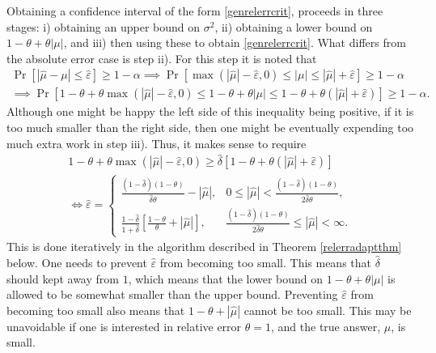 \documentclass[graybox]{svmult}
\newcommand{\Prob}{\Pr}
\newcommand{\abs}[1]{\left|#1\right|}
\newcommand{\hmu}{\hat{\mu}}
\newcommand{\hdelta}{\hat{\delta}}
\newcommand{\hvareps}{\hat{\varepsilon}}
\def\abs#1{\ensuremath{\left \lvert #1 \right \rvert}}
\begin{document}
Obtaining a confidence interval of the form \eqref{genrelerrcrit}, proceeds in three stages: i) obtaining an upper bound on $\sigma^2$, ii) obtaining a lower bound on $1-\theta + \theta\abs{\mu}$, and iii) then using these to obtain \eqref{genrelerrcrit}.  What differs from the absolute error case is step ii).  For this step it is noted that
\begin{multline} \label{relerrcritd}
\Prob\left[\abs{\hmu-\mu} \le \hvareps \right] \ge 1-\alpha \implies \Prob[\max(\abs{\hmu}-\hvareps,0) \le \abs{\mu} \le \abs{\hmu}+\hvareps] \ge 1-\alpha \\
\implies \Prob[1-\theta + \theta\max(\abs{\hmu}-\hvareps,0) \le 1-\theta + \theta\abs{\mu} \le 1-\theta + \theta(\abs{\hmu}+\hvareps)] \ge 1-\alpha.
\end{multline}
Although one might be happy the left side of this inequality being positive, if it is too much smaller than the right side, then one might be eventually expending too much extra work in step iii).  Thus, it makes sense to require 
\begin{gather*}
1-\theta + \theta\max(\abs{\hmu}-\hvareps,0) \ge \hdelta [1-\theta + \theta(\abs{\hmu}+\hvareps)] \\
\iff \hvareps = \begin{cases}
\displaystyle \frac{(1-\hdelta)(1-\theta)}{\hdelta \theta} -\abs{\hmu}, & 
\displaystyle 0 \le \abs{\hmu}  < \frac{(1-\hdelta)(1-\theta)}{2 \hdelta \theta},
 \\[2ex]
\displaystyle \frac{1-\hdelta}{1+\hdelta} \left[\frac{1-\theta}{\theta} +\abs{\hmu}\right], & 
\displaystyle \frac{(1-\hdelta)(1-\theta)}{2 \hdelta \theta} \le \abs{\hmu}  < \infty.
\end{cases}
\end{gather*}
This is done iteratively in the algorithm described in Theorem \ref{relerradaptthm} below.  One needs to prevent $\hvareps$ from becoming too small.  This means that $\hdelta$ should kept away from $1$, which means that the lower bound on $1-\theta + \theta\abs{\mu}$ is allowed to be somewhat smaller than the upper bound.  Preventing $\hvareps$ from becoming too small also means that $1-\theta + \abs{\hmu}$ cannot be too small. This may be unavoidable if one is interested in relative error $\theta=1$, and the true answer, $\mu$, is small.
\end{document}
